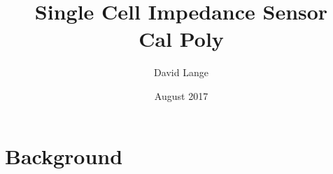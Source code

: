 \documentclass[12pt]{report}
\title{
        {Single Cell Impedance Sensor}\\
        {\large Cal Poly}
}
\author{David Lange}
\date{August 2017}
\begin{document}


%

%

%

\tableofcontents

\listoffigures

\listoftables

\doublespacing

%
\newpage
{}





%

\chapter{Background}


%

% 

%

\singlespacing
\printbibliography
\end{document}
